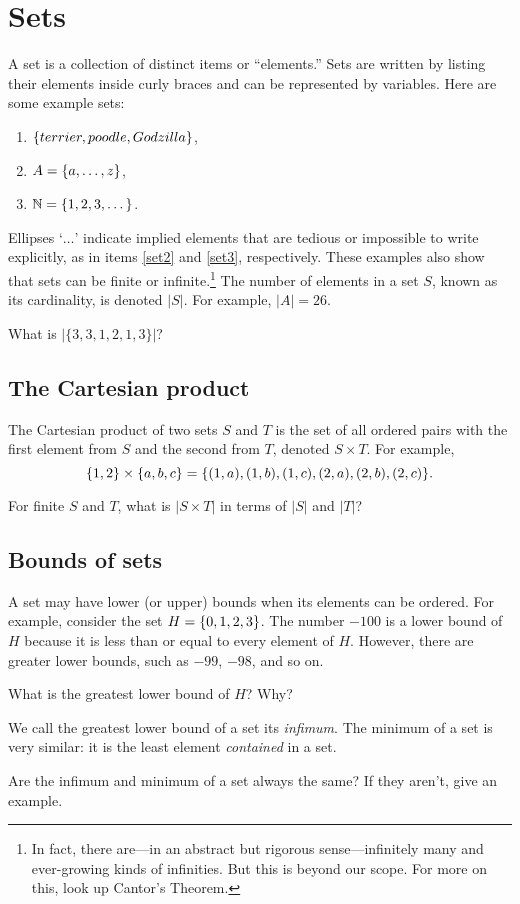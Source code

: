 \documentclass{book}
\begin{document}
\section{Sets}
A set is a collection of distinct items or ``elements.'' Sets are written by listing their elements inside curly braces and can be represented by variables. Here are some example sets:
\begin{enumerate}[label = (\arabic*)]
\item $\{terrier, poodle, Godzilla\}$,
\item\label{set2} $A = \{a, \dots, z\}$,
\item\label{set3} $\mathbb{N} = \{1, 2, 3, \dots\}$.
\end{enumerate}
Ellipses `{$\dots$}' indicate implied elements that are tedious or impossible to write explicitly, as in items \ref{set2} and \ref{set3}, respectively. These examples also show that sets can be finite or infinite.\footnote{In fact, there are---in an abstract but rigorous sense---infinitely many and ever-growing kinds of infinities. But this is beyond our scope. For more on this, look up Cantor's Theorem.} The number of elements in a set $S$, known as its cardinality, is denoted $|S|$. For example, $|A| = 26$.

\begin{exercise}\label{distinct}
What is $|\{3, 3, 1, 2, 1, 3\}|$?
\end{exercise}

\subsection{The Cartesian product}
The Cartesian product of two sets $S$ and $T$ is the set of all ordered pairs with the first element from $S$ and the second from $T$, denoted $S \times T$.
For example, \[\{1, 2\} \times \{a, b, c\} = \{(1, a), (1, b), (1, c), (2, a), (2, b), (2, c)\}.\]
\begin{exercise}\label{cartesianques}
For finite $S$ and $T$, what is $|S \times T|$ in terms of $|S|$ and $|T|$?
\end{exercise}

\subsection{Bounds of sets}
A set may have lower (or upper) bounds when its elements can be ordered. For example, consider the set $H = \{0, 1, 2, 3\}$. The number $-100$ is a lower bound of $H$ because it is less than or equal to every element of $H$. However, there are greater lower bounds, such as $-99$, $-98$, and so on.
\begin{exercise}\label{lowerbound}
What is the greatest lower bound of $H$? Why?
\end{exercise}
We call the greatest lower bound of a set its \textit{infimum}. The minimum of a set is very similar: it is the least element \emph{contained} in a set.
\begin{exercise}\label{reallower}
Are the infimum and minimum of a set always the same? If they aren't, give an example.
\end{exercise}
\end{document}
